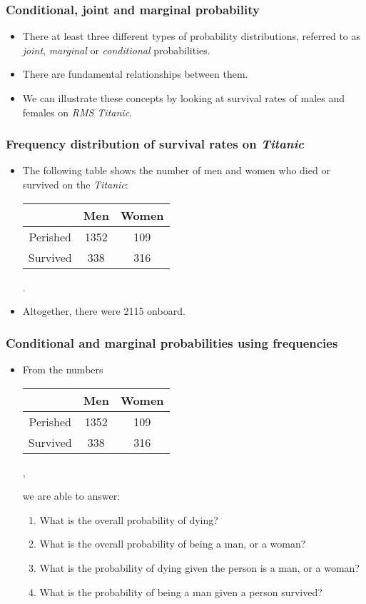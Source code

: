 \documentclass[10pt,xcolor=dvipsnames,serif,professionalfont]{beamer} %
\begin{document}
\begin{frame}
\frametitle{Conditional, joint and marginal probability}
\begin{itemize}
\item There at least three different types of probability distributions,
referred to as \emph{joint}, \emph{marginal} or \emph{conditional} probabilities. 
\item There are
fundamental relationships between them. 
\item We can illustrate these concepts by looking at survival rates of males and females on \emph{RMS Titanic}.
\end{itemize}
\end{frame}

\begin{frame}
\frametitle{Frequency distribution of survival rates on \emph{Titanic}}
\begin{itemize}
\item The following table shows the number of men and women who died or survived on the \emph{Titanic}:

\begin{center}
\begin{table}
\begin{tabular}{c|cc}
& Men & Women \\\hline
Perished & 1352 & 109 \\
Survived & 338 & 316 \\
\end{tabular}.
\end{table}
\end{center}
\item Altogether, there were 2115 onboard.
\end{itemize}
\end{frame}


\begin{frame}
\frametitle{Conditional and marginal probabilities using frequencies}
\begin{itemize}
\item From the numbers
\begin{center}
{\scriptsize
\begin{tabular}{c|cc}
& Men & Women \\\hline
Perished & 1352 & 109 \\
Survived & 338 & 316 \\
\end{tabular},
}
\end{center}
we are able to answer:
\begin{enumerate}
\item What is the overall probability of dying?
\item What is the overall probability of being a man, or a woman?
\item What is the probability of dying given the person is a man, or a woman?
\item What is the probability of being a man given a person survived?
\end{enumerate}

\end{itemize}
\end{frame}
\end{document}
